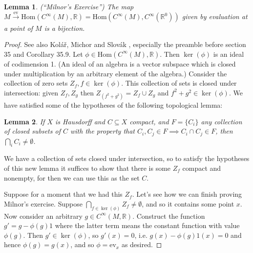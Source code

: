 \documentclass[12pt]{article}
\newcommand{\Hom}{\mathrm{Hom}}
\newcommand{\rr}{\ensuremath{\mathbb{R}}}
\newcommand{\cinfty}{\ensuremath{C^{\infty}}}
\newtheorem{mylemma}{Lemma}
\begin{document}
\begin{mylemma}\label{lemma:smoothfact1}(``Milnor's Exercise'') The map $M\xrightarrow[]{\mathrm{ev}}\Hom(\cinfty(M),\rr)=\Hom(\cinfty(M),\cinfty(\rr^0))$ given by evaluation at a point of $M$ is a bijection.
\end{mylemma}
\begin{proof}
See also Kolář, Michor and Slovák \cite{kolar_natural_1993}, especially the preamble before section 35 and Corollary 35.9. Let $\phi\in\Hom(\cinfty(M), \rr)$. Then $\ker(\phi)$ is an ideal of codimension 1. (An ideal of an algebra is a vector subspace which is closed under multiplication by an arbitrary element of the algebra.) Consider the collection of zero sets $Z_f, f\in \ker(\phi)$. This collection of sets is closed under intersection: given $Z_f, Z_g$ then $Z_{(f^2+g^2)} = Z_f\cup Z_g$ and $f^2+g^2\in\ker(\phi)$. We have satisfied some of the hypotheses of the following topological lemma: 

\begin{mylemma}If $X$ is Hausdorff and $C\subseteq X$ compact, and $F=\{C_i\}$ any collection of closed subsets of $C$ with the property that $C_i, C_j\in F\implies C_i\cap C_j\in F$, then $\bigcap_i C_i \neq\emptyset$.\end{mylemma}

We have a collection of sets closed under intersection, so to satisfy the hypotheses of this new lemma it suffices to show that there is some $Z_f$ compact and nonempty, for then we can use this as the set $C$. 

Suppose for a moment that we had this $Z_f$. Let's see how we can finish proving Milnor's exercise. Suppose $\bigcap_{f\in\ker(\phi)}Z_f\neq\emptyset$, and so it contains some point $x$. Now consider an arbitrary $g\in\cinfty(M,\rr)$. Construct the function $g'=g-\phi(g)1$ where the latter term means the constant function with value $\phi(g)$. Then $g'\in\ker(\phi)$, so $g'(x)=0$, i.e. $g(x)-\phi(g)1(x)=0$ and hence $\phi(g)=g(x)$, and so $\phi=\mathrm{ev}_x$ as desired.


\end{proof}
\end{document}
